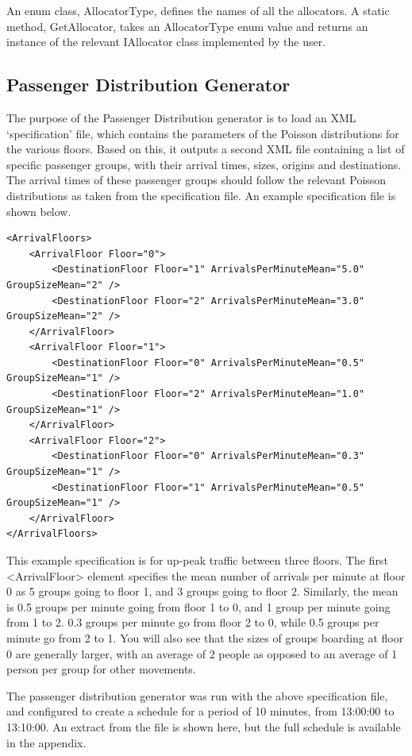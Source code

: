\documentclass{UoYCSproject}
\begin{document}
An enum class, AllocatorType, defines the names of all the allocators.  A static method, GetAllocator, takes an AllocatorType enum value and returns an instance of the relevant IAllocator class implemented by the user.

\subsection{Passenger Distribution Generator}

The purpose of the Passenger Distribution generator is to load an XML `specification' file, which contains the parameters of the Poisson distributions for the various floors.  Based on this, it outputs a second XML file containing a list of specific passenger groups, with their arrival times, sizes, origins and destinations.  The arrival times of these passenger groups should follow the relevant Poisson distributions as taken from the specification file.  An example specification file is shown below.

\lstset{language=XML, basicstyle=\ttfamily\tiny, breaklines=true, breakatwhitespace=true}
\begin{lstlisting}
<ArrivalFloors>
	<ArrivalFloor Floor="0">
		<DestinationFloor Floor="1" ArrivalsPerMinuteMean="5.0" GroupSizeMean="2" />
		<DestinationFloor Floor="2" ArrivalsPerMinuteMean="3.0" GroupSizeMean="2" />
	</ArrivalFloor>
	<ArrivalFloor Floor="1">
		<DestinationFloor Floor="0" ArrivalsPerMinuteMean="0.5" GroupSizeMean="1" />
		<DestinationFloor Floor="2" ArrivalsPerMinuteMean="1.0" GroupSizeMean="1" />
	</ArrivalFloor>
	<ArrivalFloor Floor="2">
		<DestinationFloor Floor="0" ArrivalsPerMinuteMean="0.3" GroupSizeMean="1" />
		<DestinationFloor Floor="1" ArrivalsPerMinuteMean="0.5" GroupSizeMean="1" />
	</ArrivalFloor>
</ArrivalFloors>
\end{lstlisting}

This example specification is for up-peak traffic between three floors.  The first <ArrivalFloor> element specifies the mean number of arrivals per minute at floor 0 as 5 groups going to floor 1, and 3 groups going to floor 2.  Similarly, the mean is 0.5 groups per minute going from floor 1 to 0, and 1 group per minute going from 1 to 2.  0.3 groups per minute go from floor 2 to 0, while 0.5 groups per minute go from 2 to 1.  You will also see that the sizes of groups boarding at floor 0 are generally larger, with an average of 2 people as opposed to an average of 1 person per group for other movements.

The passenger distribution generator was run with the above specification file, and configured to create a schedule for a period of 10 minutes, from 13:00:00 to 13:10:00.  An extract from the file is shown here, but the full schedule is available in the appendix.
\end{document}
